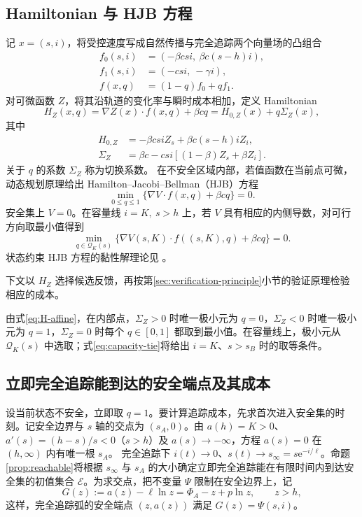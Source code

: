 \documentclass[lang=cn,a4paper,newtx]{elegantpaper}
\theoremstyle{plain}
\theoremstyle{definition}
\newcommand{\e}{\mathrm e}
\begin{document}
\subsection{Hamiltonian 与 HJB 方程}
\label{sec:HJB}
记 $x=(s,i)$，将受控速度写成自然传播与完全追踪两个向量场的凸组合
\begin{align}
f_0(s,i)&=(-\beta csi,\ \beta c(s-h)i),\label{eq:f0}\\
f_1(s,i)&=(-csi,\ -\gamma i),\label{eq:f1}\\
f(x,q)&=(1-q)f_0+qf_1.\label{eq:control-affine}
\end{align}
对可微函数 $Z$，将其沿轨道的变化率与瞬时成本相加，定义 Hamiltonian
\begin{equation}
H_Z(x,q)=\nabla Z(x)\cdot f(x,q)+\beta cq
=H_{0,Z}(x)+q\Sigma_Z(x),
\label{eq:H-affine}
\end{equation}
其中
\begin{align}
H_{0,Z}&=-\beta csiZ_s+\beta c(s-h)iZ_i,\label{eq:H0}\\
\Sigma_Z&=\beta c-csi[(1-\beta)Z_s+\beta Z_i].\label{eq:switching-function}
\end{align}
关于 $q$ 的系数 $\Sigma_Z$ 称为切换系数。
在不安全区域内部，若值函数在当前点可微，动态规划原理给出 Hamilton--Jacobi--Bellman（HJB）方程
\begin{equation}
\min_{0\le q\le1}\{\nabla V\cdot f(x,q)+\beta cq\}=0.
\label{eq:HJB}
\end{equation}
安全集上 $V=0$。在容量线 $i=K,\ s>h$ 上，若 $V$ 具有相应的内侧导数，对可行方向取最小值得到
\begin{equation}
\min_{q\in \mathcal Q_K(s)}\{\nabla V(s,K)\cdot f((s,K),q)+\beta cq\}=0.
\label{eq:boundary-HJB}
\end{equation}
状态约束 HJB 方程的黏性解理论见 \textcite{Soner1986}。

下文以 $H_Z$ 选择候选反馈，再按第\ref{sec:verification-principle}小节的验证原理检验相应的成本。

由式\eqref{eq:H-affine}，在内部点，$\Sigma_Z>0$ 时唯一极小元为 $q=0$，$\Sigma_Z<0$ 时唯一极小元为 $q=1$，$\Sigma_Z=0$ 时每个 $q\in[0,1]$ 都取到最小值。在容量线上，极小元从 $\mathcal Q_K(s)$ 中选取；式\eqref{eq:capacity-tie}将给出 $i=K$、$s>s_B$ 时的取等条件。

\subsection{立即完全追踪能到达的安全端点及其成本}
\label{sec:q1-value}
设当前状态不安全，立即取 $q=1$。要计算追踪成本，先求首次进入安全集的时刻。记安全边界与 $s$ 轴的交点为 $(s_A,0)$。由 $a(h)=K>0$、$a'(s)=(h-s)/s<0$（$s>h$）及 $a(s)\to-\infty$，方程 $a(s)=0$ 在 $(h,\infty)$ 内有唯一根 $s_A$。
完全追踪下 $i(t)\to0$、$s(t)\to s_\infty=s\e^{-i/\ell}$。命题\ref{prop:reachable}将根据 $s_\infty$ 与 $s_A$ 的大小确定立即完全追踪能在有限时间内到达安全集的初值集合 $\mathcal E$。为求交点，把不变量 $\Psi$ 限制在安全边界上，记
\[
G(z):=a(z)-\ell\ln z=\Phi_A-z+p\ln z,\qquad z>h,
\]
这样，完全追踪弧的安全端点 $(z,a(z))$ 满足 $G(z)=\Psi(s,i)$。
\end{document}
